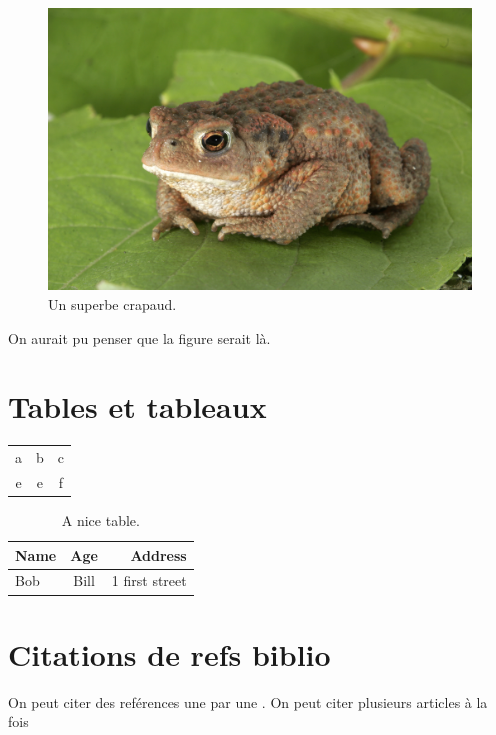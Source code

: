 \documentclass[10pt,a4paper,twoside]{article}
\begin{document}
\blindtext[2]

\begin{figure}[htbp]
    \begin{center}
        \includegraphics[width=1.\textwidth]{figures/toad.jpg}
    \end{center}
    \caption{Un superbe crapaud.}
    \label{fig:toad}
\end{figure}

On aurait pu penser que la figure serait là.
\blindtext[2]

\section{Tables et tableaux}

\begin{tabular}{ccc}
    a & b & c \\
    e & e & f
\end{tabular}

\begin{table}[]
    \caption{A nice table.}
    \label{tab:nice_table}
    \begin{center}
        \begin{tabular}{@{}lcr@{}}
            \toprule
            Name & Age & Address \\
            \midrule
            Bob & Bill  & 1 first street \\
            \bottomrule
        \end{tabular}
    \end{center}
    
\end{table}


\section{Citations de refs biblio}

On peut citer des reférences une par une \cite{hawking1974black}. 
On peut citer plusieurs articles à la fois \cite{belczynski2012missing,hawking1974black}



\end{document}
